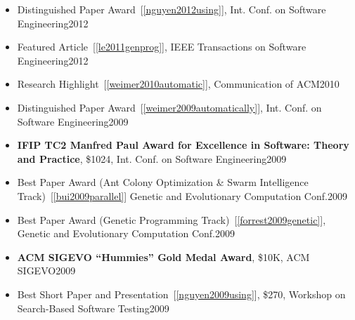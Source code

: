 \documentclass[11pt]{article}
\begin{document}
\begin{itemize}
\item Distinguished Paper Award~[\ref{nguyen2012using}], Int. Conf. on Software Engineering\hfill 2012

\item Featured Article~[\ref{le2011genprog}], IEEE Transactions on Software Engineering\hfill 2012

\item Research Highlight~[\ref{weimer2010automatic}], Communication of ACM\hfill 2010

\item Distinguished Paper Award~[\ref{weimer2009automatically}], Int. Conf. on Software Engineering\hfill 2009 

\item \textbf{IFIP TC2 Manfred Paul Award for Excellence in Software: Theory and Practice}, \$1024, Int. Conf. on Software Engineering\hfill 2009
  

\item Best Paper Award (Ant Colony Optimization \& Swarm Intelligence Track)~[\ref{bui2009parallel}] Genetic and Evolutionary Computation Conf.\hfill 2009
\item Best Paper Award (Genetic Programming Track)~[\ref{forrest2009genetic}], Genetic and Evolutionary Computation Conf.\hfill 2009
\item \textbf{ACM SIGEVO “Hummies” Gold Medal Award}, \$10K, ACM SIGEVO\hfill 2009
\item Best Short Paper and Presentation~[\ref{nguyen2009using}], \$270, Workshop on Search-Based Software Testing\hfill 2009



\end{itemize}
\end{document}
